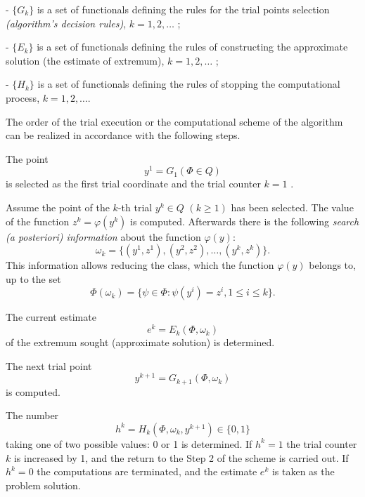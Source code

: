 -  $\{G_k\}$	  is a set of functionals defining the rules for the trial points selection \textit {(algorithm's decision rules)}, $k=1,2,\ldots$ ;

-  $\{E_k\}$	  is a set of functionals defining the rules of constructing the approximate solution (the estimate of extremum), $k=1,2,\ldots$ ;

-  $\{H_k\}$	  is a set of functionals defining the rules of stopping the computational process,  $k=1,2,\ldots$.

The order of the trial execution or the computational scheme of the algorithm   can be realized in accordance with the following steps.

\begin{description}
\item[\textbf{Step 1}]{The point 
\begin{equation}
\label{eq:12}
y^1=G_1(\Phi\in Q)
\end{equation}
is selected as the first trial coordinate and the trial counter $k=1$ .}
\item[\textbf{Step 2}]{Assume the point of the $k$-th trial $y^k\in Q$  $(k\geq 1)$ has been selected. The value of the function $z^k=\varphi(y^k)$  is computed. Afterwards there is the following \textit {search (a posteriori) information} about the function $\varphi(y)$:
\begin{equation}
\label{eq:13}
\omega_k=\{(y^1,z^1),(y^2,z^2),\ldots ,(y^k,z^k)\}.
\end{equation}
This information allows reducing the class, which the function  $\varphi(y)$ belongs to, up to the set
\begin{equation}
\label{eq:14}
\Phi(\omega_k)=\{\psi\in\Phi:\psi(y^i)=z^i,1\leq i \leq k\}.
\end{equation}
}
\item[\textbf{Step 3}]{The current estimate 
\begin{equation}
\label{eq:15}
e^k=E_k(\Phi,\omega_k)
\end{equation}
of the extremum sought (approximate solution) is determined.}
\item[\textbf{Step 4}]{The next trial point 
\begin{equation}
\label{eq:16}
y^{k+1}=G_{k+1}(\Phi,\omega_k)
\end{equation}
is computed.}
\item[\textbf{Step 5}]{The number 
\begin{equation}
\label{eq:17}
h^k=H_k(\Phi,\omega_k,y^{k+1})\in \{0,1\}
\end{equation}
taking one of two possible values: 0 or 1 is determined. If $h^k=1$ the trial counter $k$ is increased by 1, and the return to the Step 2 of the scheme is carried out. If $h^k=0$ the computations are terminated, and the estimate $e^k$  is taken as the problem solution.}
\end{description}

